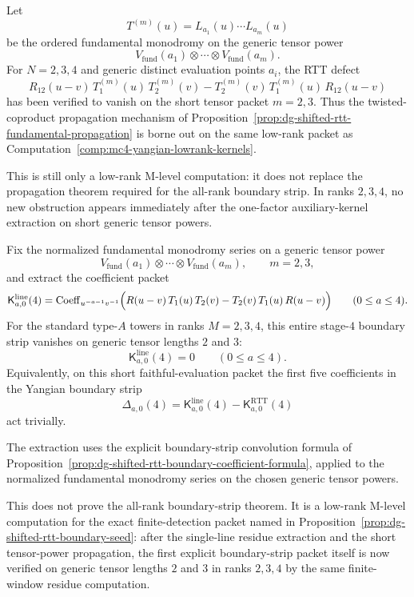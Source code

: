 \begin{computation}
\label{comp:mc4-yangian-lowrank-propagation}
Let
\[
T^{(m)}(u)=L_{a_1}(u)\cdots L_{a_m}(u)
\]
be the ordered fundamental monodromy on the generic tensor power
\[
V_{\mathrm{fund}}(a_1)\otimes\cdots\otimes V_{\mathrm{fund}}(a_m).
\]
For $N=2,3,4$ and generic distinct evaluation points $a_i$, the RTT
defect
\[
R_{12}(u-v)\,T^{(m)}_1(u)\,T^{(m)}_2(v)
-
T^{(m)}_2(v)\,T^{(m)}_1(u)\,R_{12}(u-v)
\]
has been verified to vanish on the short tensor packet $m=2,3$.
Thus the twisted-coproduct propagation mechanism of
Proposition~\ref{prop:dg-shifted-rtt-fundamental-propagation} is borne
out on the same low-rank packet as
Computation~\ref{comp:mc4-yangian-lowrank-kernels}.

This is still only a low-rank M-level computation: it does not replace
the propagation theorem required for the all-rank boundary
strip. In ranks $2,3,4$, no new obstruction appears
immediately after the one-factor auxiliary-kernel extraction on short
generic tensor powers.
\end{computation}

\begin{computation}
\label{comp:mc4-yangian-boundary-strip-stage4}
Fix the normalized fundamental monodromy series on a generic tensor
power
\[
V_{\mathrm{fund}}(a_1)\otimes\cdots\otimes V_{\mathrm{fund}}(a_m),
\qquad m=2,3,
\]
and extract the coefficient packet
\[
\mathsf{K}^{\mathrm{line}}_{a,0}(4)
=
\operatorname{Coeff}_{u^{-a-1}v^{-1}}
\Bigl(
R(u-v)\,T_1(u)\,T_2(v)-T_2(v)\,T_1(u)\,R(u-v)
\Bigr)
\qquad (0\le a\le 4).
\]
For the standard type-$A$ towers in ranks $M=2,3,4$, this entire
stage-$4$ boundary strip vanishes on generic tensor lengths $2$ and
$3$:
\[
\mathsf{K}^{\mathrm{line}}_{a,0}(4)=0
\qquad (0\le a\le 4).
\]
Equivalently, on this short faithful-evaluation packet the first five
coefficients in the Yangian boundary strip
\[
\Delta_{a,0}(4)
=
\mathsf{K}^{\mathrm{line}}_{a,0}(4)
-\mathsf{K}^{\mathrm{RTT}}_{a,0}(4)
\]
act trivially.

The extraction uses the explicit boundary-strip convolution formula of
Proposition~\ref{prop:dg-shifted-rtt-boundary-coefficient-formula},
applied to the normalized fundamental monodromy series on the chosen
generic tensor powers.

This does not prove the all-rank boundary-strip theorem. It is a
low-rank M-level computation for the exact finite-detection packet
named in Proposition~\ref{prop:dg-shifted-rtt-boundary-seed}: after the
single-line residue extraction and the short tensor-power propagation,
the first explicit boundary-strip packet itself is now verified on
generic tensor lengths $2$ and $3$ in ranks $2,3,4$
by the same finite-window residue computation.
\end{computation}

